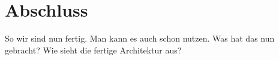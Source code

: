 \section{Abschluss}
So wir sind nun fertig. Man kann es auch schon nutzen. Was hat das nun gebracht? Wie sieht die fertige Architektur aus?